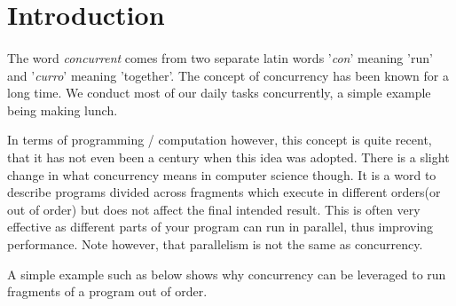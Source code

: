 

\section{Introduction}
    \paragraph{}
    The word \textit{concurrent} comes from two separate latin words '\textit{con}' meaning 'run' and '\textit{curro}' meaning 'together'. The concept of concurrency has been known for a long time. We conduct most of our daily tasks concurrently, a simple example being making lunch.
    
    In terms of programming / computation however, this concept is quite recent, that it has not even been a century when this idea was adopted. There is a slight change in what concurrency means in computer science though. It is a word to describe programs divided across fragments which execute in different orders(or out of order) but does not affect the final intended result. This is often very effective as different parts of your program can run in parallel, thus improving performance. Note however, that parallelism is not the same as concurrency. 
    
    A simple example such as below shows why concurrency can be leveraged to run fragments of a program out of order.
    
    \begin{center}
    \end{center}
    

